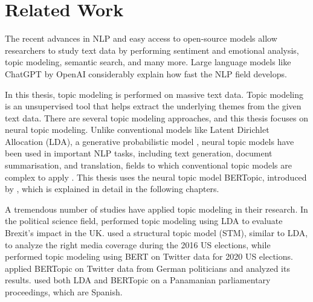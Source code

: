 
\chapter{Related Work}\label{chapter:related_work}

The recent advances in \ac{NLP} and easy access to open-source models allow researchers to 
study text data by performing sentiment and emotional analysis, topic modeling, 
semantic search, and many more. Large language models like ChatGPT by OpenAI considerably 
explain how fast the NLP field develops.

In this thesis, topic modeling is performed on massive text data. Topic modeling is an 
unsupervised tool that helps extract the underlying themes from the given text data. 
There are several topic modeling approaches, and this thesis focuses on neural topic modeling. 
Unlike conventional models like Latent Dirichlet Allocation (LDA), a generative probabilistic 
model \parencite{blei_lda_2003}, neural topic models have been used in important NLP 
tasks, including text generation, document summarisation, and translation, fields to 
which conventional topic models are complex to apply \parencite{zhao_neural_topic_models_2021}.
This thesis uses the neural topic model BERTopic, introduced by \textcite{bertopic}, 
which is explained in detail in the following chapters.

A tremendous number of studies have applied topic modeling in their research. 
In the political science field, \textcite{ilyas_brexit_topic_modeling_2020} performed 
topic modeling using LDA to evaluate Brexit’s impact in the UK.
\textcite{kaiser_right_media_USA_stm_topic_modeling_2020} used a structural topic model (STM), 
similar to LDA, to analyze the right media coverage during the 2016 US elections, while 
\textcite{anwar_analyzing_twitter_BERT_QAnon_2021} performed topic modeling using BERT on 
Twitter data for 2020 US elections. \textcite{bertopic_twitter_german_politics_2022} 
applied BERTopic on Twitter data from German politicians and analyzed its results. 
\textcite{contreras_panama_lda_bertopic_2022} used both LDA and BERTopic on a 
Panamanian parliamentary proceedings, which are Spanish. 




